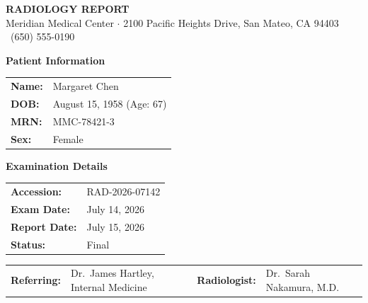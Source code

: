 \documentclass[11pt]{article}
\begin{document}
\begin{headerbar}
  {\LARGE\bfseries\sffamily RADIOLOGY REPORT} \\[2pt]
  {\small\sffamily Meridian Medical Center $\cdot$ 2100 Pacific Heights Drive, San Mateo, CA 94403
  \hfill \faPhone\ (650) 555-0190}
\end{headerbar}

\vspace{10pt}

\begin{infobox}
  \begin{minipage}[t]{0.48\textwidth}
    \raggedright
    {\sffamily\bfseries\color{primaryblue} Patient Information} \\[4pt]
    \begin{tabular}{@{}p{1.2in} p{2.5in}@{}}
      \textbf{Name:}       & Margaret Chen \\
      \textbf{DOB:}        & August 15, 1958 (Age: 67) \\
      \textbf{MRN:}        & MMC-78421-3 \\
      \textbf{Sex:}        & Female \\
    \end{tabular}
  \end{minipage}
  \hfill
  \begin{minipage}[t]{0.48\textwidth}
    \raggedright
    {\sffamily\bfseries\color{primaryblue} Examination Details} \\[4pt]
    \begin{tabular}{@{}p{1.2in} p{2.5in}@{}}
      \textbf{Accession:}  & RAD-2026-07142 \\
      \textbf{Exam Date:}  & July 14, 2026 \\
      \textbf{Report Date:}& July 15, 2026 \\
      \textbf{Status:}     & Final \\
    \end{tabular}
  \end{minipage}
  \par
  \vspace{2pt}
  \begin{tabular}{@{}p{0.95in} p{2.0in} p{0.9in} p{1.9in}@{}}
    \textbf{Referring:} & Dr.\ James Hartley, Internal Medicine &
    \textbf{Radiologist:} & Dr.\ Sarah Nakamura, M.D. \\
  \end{tabular}
\end{infobox}

\vspace{10pt}
\end{document}
